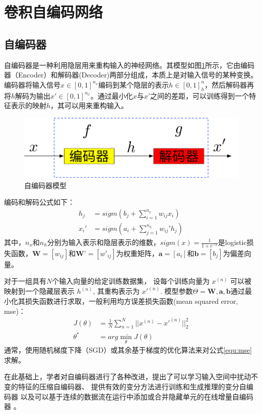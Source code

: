 \section{卷积自编码网络}
\subsection{自编码器}

自编码器是一种利用隐层用来重构输入的神经网络。其模型如图\ref{fig:ae}所示，它由编码器（Encoder）和解码器(Decoder)两部分组成，本质上是对输入信号的某种变换。编码器将输入信号$x\in[0,1]^{n_x}$编码到某个隐层的表示$h\in[0,1]^n_h$，然后解码器再将$h$解码为输出$x'\in[0,1]^{n_x}$。通过最小化$x$与$x'$之间的差距，可以训练得到一个特征表示的映射$h$，其可以用来重构输入。
\begin{figure}
	\centering
	\includegraphics[width=\textwidth]{figures/AE/ae}
	\caption{自编码器模型}
	\label{fig:ae}
\end{figure}
编码和解码公式如下：
\begin{align}
	h_j &= sigm(b_j+\sum_{i=1}^{n_x}w_{ij}x_i) \\
	x_i' &= sigm(a_i+\sum_{j=1}^{n_h}w_{ij}'h_j)
\end{align}
其中，$n_x$和$n_h$分别为输入表示和隐层表示的维数，$sigm(x)=\frac{1}{1+e^{-x}}$是logistic损失函数，$\textbf{W}=[w_{ij}]$和$\textbf{W'}=[w'_{ij}]$为权重矩阵，$\textbf{a}=[a_i]$和$\textbf{b}=[b_j]$为偏差向量。

对于一组具有$N$个输入向量的给定训练数据集，
设每个训练向量为 $x^{(n)}$ 可以被映射到一个隐藏层表示 $h^{(n)}$, 其重构表示为 $x′^{(n)}$. 模型参数$\Theta={\textbf{W},\textbf{a},\textbf{b}}$通过最小化其损失函数进行求取，一般利用均方误差损失函数(mean squared error, mse)：
\begin{align}
	J(\theta) &= \frac{1}{N}\sum_{n=1}^N||x^{(n)}-x'^{(n)}||_2^2 \\
	\theta^* &= arg\min\limits_{\theta} J(\theta)  \label{equ:mse}
\end{align}
通常，使用随机梯度下降（SGD）或其余基于梯度的优化算法来对公式\ref{equ:mse}求解。

在此基础上，学者对自编码器进行了各种改进，提出了可以学习输入空间中扰动不变的特征的压缩自编码器\cite{rifai2011contractive}、
提供有效的变分方法进行训练和生成推理的变分自编码器\cite{kingma2013auto}
以及可以基于连续的数据流在运行中添加或合并隐藏单元的在线增量自编码器 \cite{zhou2012online}。

